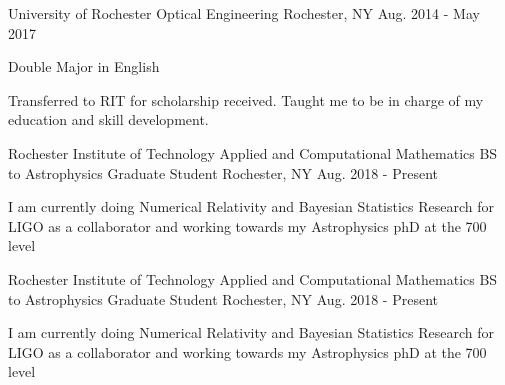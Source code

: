 \begin{cventries}
 \cventry
    {University of Rochester}
    {Optical Engineering}
    {Rochester, NY}
    {Aug. 2014 - May 2017}
    {
      \begin{cvitems}
        \item {Double Major in English}
        \item {Transferred to RIT for scholarship received. Taught me to be in charge of my education and skill development.}
      \end{cvitems}
      
   }
   
\cventry
    {Rochester Institute of Technology}
    {Applied and Computational Mathematics BS to Astrophysics Graduate Student}
    {Rochester, NY}
    {Aug. 2018 - Present}
    {
      \begin{cvitems}
       \item{I am currently doing Numerical Relativity and Bayesian Statistics Research for LIGO as a collaborator and working towards my Astrophysics phD at the 700 level}
      \end{cvitems}
   }

   
 \cventry
    {Rochester Institute of Technology}
    {Applied and Computational Mathematics BS to Astrophysics Graduate Student}
    {Rochester, NY}
    {Aug. 2018 - Present}
    {
      \begin{cvitems}
       \item{I am currently doing Numerical Relativity and Bayesian Statistics Research for LIGO as a collaborator and working towards my Astrophysics phD at the 700 level}
      \end{cvitems}
   }



\end{cventries}
